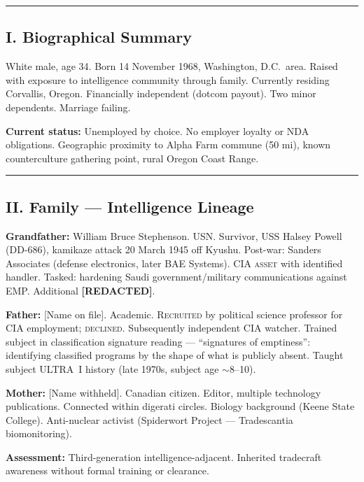 \vspace{1cm}\hrule\vspace{1cm}

\subsection*{I. Biographical Summary}
\label{interlude:biographical-summary}

White male, age 34. Born 14 November 1968, Washington, D.C.\ area. Raised with exposure to intelligence community through family. Currently residing Corvallis, Oregon. Financially independent (dotcom payout). Two minor dependents. Marriage failing.

\textbf{Current status:} Unemployed by choice. No employer loyalty or NDA obligations. Geographic proximity to Alpha Farm commune (50 mi), known counterculture gathering point, rural Oregon Coast Range.

\vspace{1cm}\hrule\vspace{1cm}

\subsection*{II. Family --- Intelligence Lineage}
\label{interlude:family-intelligence-lineage}

\textbf{Grandfather:} William Bruce Stephenson. USN. Survivor, USS Halsey Powell (DD-686), kamikaze attack 20 March 1945 off Kyushu. Post-war: Sanders Associates (defense electronics, later BAE Systems). CIA \textsc{asset} with identified handler. Tasked: hardening Saudi government/military communications against EMP. Additional \textbf{[REDACTED]}.

\textbf{Father:} [Name on file]. Academic. \textsc{Recruited} by political science professor for CIA employment; \textsc{declined}. Subsequently independent CIA watcher. Trained subject in classification signature reading --- ``signatures of emptiness'': identifying classified programs by the shape of what is publicly absent. Taught subject ULTRA~I history (late 1970s, subject age $\sim$8--10).

\textbf{Mother:} [Name withheld]. Canadian citizen. Editor, multiple technology publications. Connected within digerati circles. Biology background (Keene State College). Anti-nuclear activist (Spiderwort Project --- Tradescantia biomonitoring).

\textbf{Assessment:} Third-generation intelligence-adjacent. Inherited tradecraft awareness without formal training or clearance.

